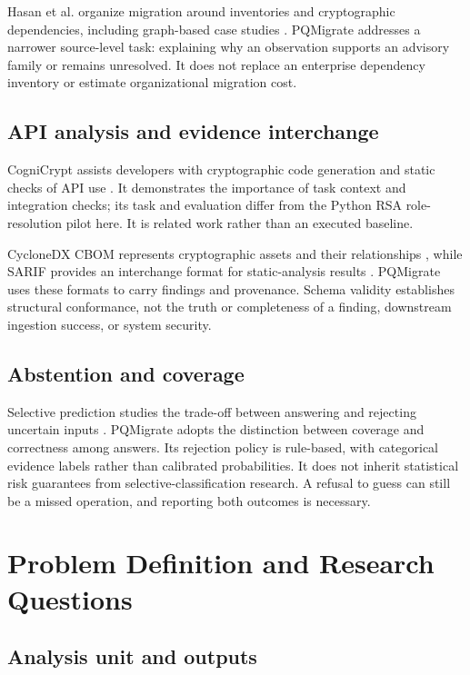 \documentclass[conference,a4paper]{IEEEtran}
\begin{document}
Hasan et al. organize migration around inventories and cryptographic dependencies, including graph-based case studies \cite{ref4}. PQMigrate addresses a narrower source-level task: explaining why an observation supports an advisory family or remains unresolved. It does not replace an enterprise dependency inventory or estimate organizational migration cost.

\subsection{API analysis and evidence interchange}

CogniCrypt assists developers with cryptographic code generation and static checks of API use \cite{ref7}. It demonstrates the importance of task context and integration checks; its task and evaluation differ from the Python RSA role-resolution pilot here. It is related work rather than an executed baseline.

CycloneDX CBOM represents cryptographic assets and their relationships \cite{ref8}, while SARIF provides an interchange format for static-analysis results \cite{ref9}. PQMigrate uses these formats to carry findings and provenance. Schema validity establishes structural conformance, not the truth or completeness of a finding, downstream ingestion success, or system security.

\subsection{Abstention and coverage}

Selective prediction studies the trade-off between answering and rejecting uncertain inputs \cite{ref10}. PQMigrate adopts the distinction between coverage and correctness among answers. Its rejection policy is rule-based, with categorical evidence labels rather than calibrated probabilities. It does not inherit statistical risk guarantees from selective-classification research. A refusal to guess can still be a missed operation, and reporting both outcomes is necessary.

\section{Problem Definition and Research Questions}

\subsection{Analysis unit and outputs}
\end{document}
